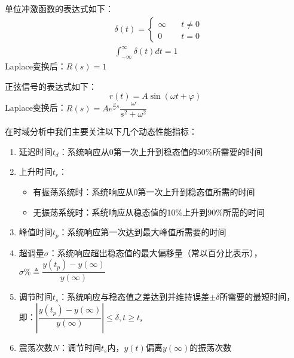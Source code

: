 \begin{definition}[单位冲激函数]
    单位冲激函数的表达式如下：
    \begin{equation*}
        \begin{split}
            &\delta(t) = \begin{cases}
                \infty \quad & t\neq 0 \\
                0 \quad & t=0
            \end{cases}\\
            &\int_{-\infty}^{\infty} \delta(t) dt = 1
        \end{split}
    \end{equation*}
    Laplace变换后：$R(s) = 1$
\end{definition}

\begin{definition}[正弦信号]
    正弦信号的表达式如下：
    \begin{equation*}
        r(t) = A \sin (\omega t + \varphi)
    \end{equation*}
    Laplace变换后：$R(s) = A e^{\frac{\varphi}{\omega} s} \dfrac{\omega}{s^2+\omega^2}$
\end{definition}

\begin{definition}[动态性能指标]
    在时域分析中我们主要关注以下几个动态性能指标：
    \begin{enumerate}
        \item 延迟时间$t_d$：系统响应从0第一次上升到稳态值的50\%所需要的时间
        \item 上升时间$t_r$：
        \begin{itemize}
            \item 有振荡系统时：系统响应从0第一次上升到稳态值所需的时间
            \item 无振荡系统时：系统响应从稳态值的10\%上升到90\%所需的时间
        \end{itemize}
        \item 峰值时间$t_p$：系统响应第一次达到最大峰值所需要的时间
        \item 超调量$\sigma$：系统响应超出稳态值的最大偏移量（常以百分比表示），$\sigma\% \triangleq \dfrac{y(t_p) - y(\infty)}{y(\infty)}$
        \item 调节时间$t_s$：系统响应与稳态值之差达到并维持误差$\pm\delta$所需要的最短时间，即：$\left\lvert\dfrac{y(t_p) - y(\infty)}{y(\infty)} \right\rvert \leq \delta ,t\geq t_s $
        \item 震荡次数$N$：调节时间$t_s$内，$y(t)$偏离$y(\infty)$的振荡次数
    \end{enumerate}
\end{definition}

